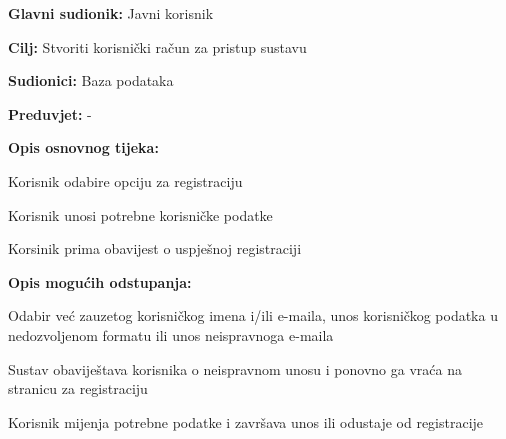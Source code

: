 \noindent {}
\begin{packed_item}
	\item \textbf{Glavni sudionik: } Javni korisnik
	\item  \textbf{Cilj:} Stvoriti korisnički račun za pristup sustavu
	\item  \textbf{Sudionici:} Baza podataka
	\item  \textbf{Preduvjet:} -
	\item  \textbf{Opis osnovnog tijeka:}
	\item[] \begin{packed_enum}
		\item Korisnik odabire opciju za registraciju
		\item Korisnik unosi potrebne korisničke podatke
		\item Korsinik prima obavijest o uspješnoj registraciji
	\end{packed_enum}
	\item  \textbf{Opis mogućih odstupanja:}
	\item[] \begin{packed_item}
		\item[2.a] Odabir već zauzetog korisničkog imena i/ili e-maila, unos korisničkog podatka u nedozvoljenom formatu ili unos neispravnoga e-maila 
		\item[] \begin{packed_enum}
			\item Sustav obaviještava korisnika o neispravnom unosu i ponovno ga vraća na stranicu za registraciju
			\item Korisnik mijenja potrebne podatke i završava unos ili odustaje od registracije
		\end{packed_enum}
	\end{packed_item}
\end{packed_item}

